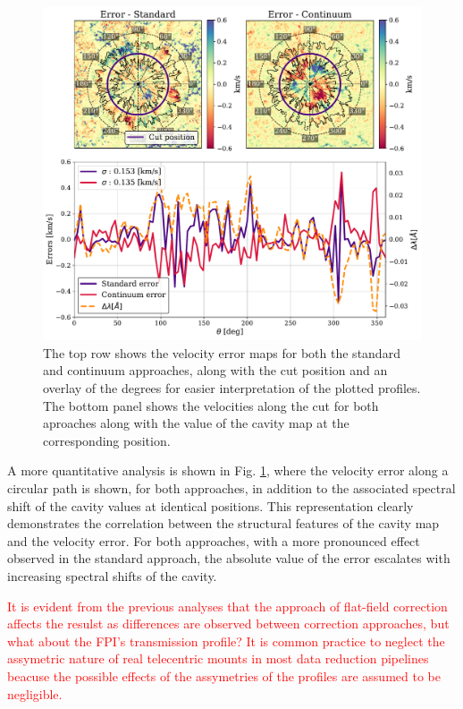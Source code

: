 \begin{figure}
  \begin{minipage}[c]{0.7\textwidth}
    \includegraphics[width=\textwidth]{figures/Mancha/circular_cut_standard_cont.pdf}
  \end{minipage}\hfill\hfill
  \begin{minipage}[c]{0.27\textwidth}
    \caption{
      The top row shows the velocity error maps for both the standard and continuum approaches, along with the cut position and an overlay of the degrees for easier interpretation of the plotted profiles. The bottom panel shows the velocities along the cut for both aproaches along with the value of the cavity map at the corresponding position.\label{fig_mancha: verror_circular_cut}} 
  \end{minipage}
\end{figure}

A more quantitative analysis is shown in Fig. \ref{fig_mancha: verror_circular_cut}, where the velocity error along a circular path is shown, for both approaches, in addition to the associated spectral shift of the cavity values at identical positions. This representation clearly demonstrates the correlation between the structural features of the cavity map and the velocity error. For both approaches, with a more pronounced effect observed in the standard approach, the absolute value of the error escalates with increasing spectral shifts of the cavity.

\textcolor{red}{It is evident from the previous analyses that the approach of flat-field correction affects the resulst as differences are observed between correction approaches, but what about the FPI's transmission profile? It is common practice to neglect the assymetric nature of real telecentric mounts in most data reduction pipelines beacuse the possible effects of the assymetries of the profiles are assumed to be negligible.} 

